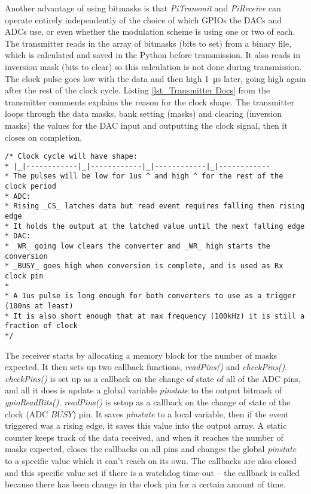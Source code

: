 \documentclass[../main.tex]{subfiles}
\begin{document}
Another advantage of using bitmasks is that \textit{PiTransmit} and \textit{PiReceive} can operate entirely independently of the choice of which GPIOs the DACs and ADCs use, or even whether the modulation scheme is using one or two of each.
The transmitter reads in the array of bitmasks (bits to set) from a binary file, which is calculated and saved in the Python before transmission.
It also reads in inversion mask (bits to clear) so this calculation is not done during transmission.
The clock pulse goes low with the data and then high \SI{1}{\micro\second} later, going high again after the rest of the clock cycle.
Listing \ref{lst_Transmitter Docs} from the transmitter comments explains the reason for the clock shape.
The transmitter loops through the data masks, bank setting (masks) and clearing (inversion masks) the values for the DAC input and outputting the clock signal, then it closes on completion.\\

\newpage

\lstset{style=C}
\begin{lstlisting}[caption={Transmitter documentation explaining the clock signal}, label={lst_Transmitter Docs}]
/* Clock cycle will have shape:
* |_|------------|_|------------|_|------------|_|------------
* The pulses will be low for 1us ^ and high ^ for the rest of the clock period
* ADC:
* Rising _CS_ latches data but read event requires falling then rising edge
* It holds the output at the latched value until the next falling edge
* DAC:
* _WR_ going low clears the converter and _WR_ high starts the conversion
* _BUSY_ goes high when conversion is complete, and is used as Rx clock pin
*
* A 1us pulse is long enough for both converters to use as a trigger (100ns at least)
* It is also short enough that at max frequency (100kHz) it is still a fraction of clock
*/
\end{lstlisting}

The receiver starts by allocating a memory block for the number of masks expected.
It then sets up two callback functions, \textit{readPins()} and \textit{checkPins()}.
\textit{checkPins()} is set up as a callback on the change of state of all of the ADC pins, and all it does is update a global variable \textit{pin\textunderscore state} to the output bitmask of \textit{gpioRead\textunderscore Bits()}.
\textit{readPins()} is setup as a callback on the change of state of the clock (ADC $\overline{BUSY}$) pin.
It saves \textit{pin\textunderscore state} to a local variable, then if the event triggered was a rising edge, it saves this value into the output array.
A static counter keeps track of the data received, and when it reaches the number of masks expected, closes the callbacks on all pins and changes the global \textit{pin\textunderscore state} to a specific value which it can't reach on its own.
The callbacks are also closed and this specific value set if there is a watchdog time-out -- the callback is called because there has been change in the clock pin for a certain amount of time.\\
\end{document}
